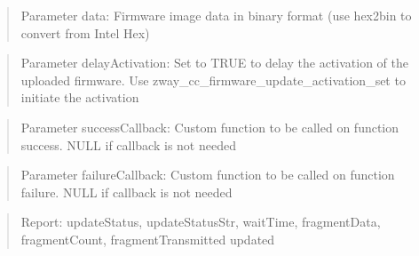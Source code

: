 \begin{quote}Parameter data: Firmware image data in binary format (use hex2bin to convert from Intel Hex)\end{quote}
\begin{quote}Parameter delayActivation: Set to TRUE to delay the activation of the uploaded firmware. Use zway\_cc\_firmware\_update\_activation\_set to initiate the activation\end{quote}
\begin{quote}Parameter successCallback: Custom function to be called on function success. NULL if callback is not needed\end{quote}
\begin{quote}Parameter failureCallback: Custom function to be called on function failure. NULL if callback is not needed\end{quote}
\begin{quote}Report: updateStatus, updateStatusStr, waitTime, fragmentData, fragmentCount, fragmentTransmitted updated\end{quote}

